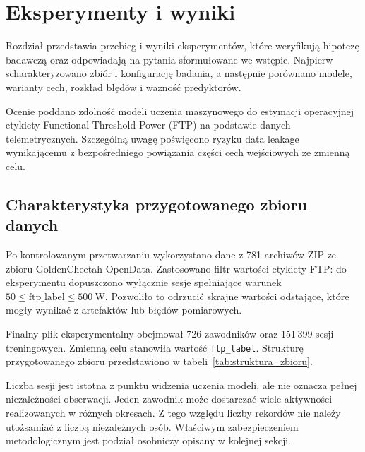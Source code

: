 \chapter{Eksperymenty i wyniki}

Rozdział przedstawia przebieg i wyniki eksperymentów, które weryfikują hipotezę badawczą oraz odpowiadają na pytania sformułowane we wstępie. Najpierw scharakteryzowano zbiór i konfigurację badania, a następnie porównano modele, warianty cech, rozkład błędów i ważność predyktorów.

Ocenie poddano zdolność modeli uczenia maszynowego do estymacji operacyjnej etykiety Functional Threshold Power (FTP) na podstawie danych telemetrycznych. Szczególną uwagę poświęcono ryzyku data leakage wynikającemu z bezpośredniego powiązania części cech wejściowych ze zmienną celu.

\section{Charakterystyka przygotowanego zbioru danych}

Po kontrolowanym przetwarzaniu wykorzystano dane z 781 archiwów ZIP ze zbioru GoldenCheetah OpenData. Zastosowano filtr wartości etykiety FTP: do eksperymentu dopuszczono wyłącznie sesje spełniające warunek $50 \le \mathrm{ftp\_label} \le 500\ \mathrm{W}$. Pozwoliło to odrzucić skrajne wartości odstające, które mogły wynikać z artefaktów lub błędów pomiarowych.

Finalny plik eksperymentalny obejmował 726 zawodników oraz 151\,399 sesji treningowych. Zmienną celu stanowiła wartość \texttt{ftp\_label}. Strukturę przygotowanego zbioru przedstawiono w tabeli~\ref{tab:struktura_zbioru}.

Liczba sesji jest istotna z punktu widzenia uczenia modeli, ale nie oznacza pełnej niezależności obserwacji. Jeden zawodnik może dostarczać wiele aktywności realizowanych w różnych okresach. Z tego względu liczby rekordów nie należy utożsamiać z liczbą niezależnych osób. Właściwym zabezpieczeniem metodologicznym jest podział osobniczy opisany w kolejnej sekcji.

